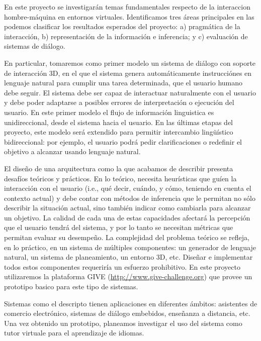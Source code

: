 
En este proyecto se investigar\'an temas fundamentales respecto de la
interaccion hombre-m\'aquina en entornos virtuales. Identificamos tres
\'areas principales en las podemos clasificar los resultados esperados
del proyecto: a) pragm\'atica de la interacci\'on, b) representaci\'on
de la informaci\'on e inferencia; y c) evaluaci\'on de sistemas
de di\'alogo.

En particular, tomaremos como primer modelo un sistema de di\'alogo con
soporte de interacci\'on 3D, en el que el sistema genera autom\'aticamente
instrucci\'ones en lenguaje natural para cumplir una tarea determinada, que
el usuario humano debe seguir.   El sistema debe ser capaz de interactuar naturalmente
con el usuario y debe poder adaptarse a posibles errores de interpretaci\'on o
ejecuci\'on del usuario.  En este primer modelo el flujo de informaci\'on
linguistica es unidireccional, desde el sistema hacia el usuario.
En las \'ultimas etapas del proyecto, este modelo ser\'a extendido para
permitir intercambio ling\"u\'istico bidireccional: por ejemplo, el usuario podr\'a
pedir clarificaciones o redefinir el objetivo a alcanzar usando lenguaje natural.

El dise\~no de una arquitectura como la que acabamos de describir presenta
desaf\'ios te\'oricos y pr\'acticos.  En lo te\'orico, necesita
heur\'isticas que gu\'ien la interacci\'on con el usuario (i.e., qu\'e decir,
cu\'ando, y c\'omo, teniendo en cuenta el contexto actual) y debe contar con m\'etodos
de inferencia que le permitan no s\'olo describir la situaci\'on actual, sino
tambi\'en indicar como cambiarla para alcanzar un objetivo.
La calidad de cada una de estas capacidades afectar\'a la percepci\'on que
el usuario tendr\'a del sistema, y por lo tanto se necesitan m\'etricas que
permitan evaluar su desempe\~no.  La complejidad del problema te\'orico se
refleja, en lo pr\'actico, en un sistema de m\'ultiples componentes: un
generador de lenguaje natural, un sistema de planeamiento, un entorno 3D, etc.
Dise\~nar e implementar todos estos componentes requerir\'ia un esfuerzo prohibitivo.
En este proyecto utilizaremos la plataforma GIVE (\url{http://www.give-challenge.org}) que
provee un prototipo basico para este tipo de sistemas.

Sistemas como el descripto tienen aplicaciones en diferentes \'ambitos:
asistentes de comercio electr\'onico, sistemas de di\'alogo embebidos,
ense\~nanza a distancia, etc.  Una vez obtenido
un prototipo, planeamos investigar el uso del sistema como
tutor virtuale para el aprendizaje de idiomas.

